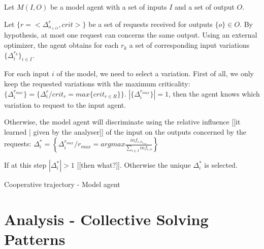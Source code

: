 Let $M(I,O)$ be a model agent with a set of inputs $I$ and a set of output $O$.

Let $\{r= <\Delta_{o_{\in O}}^{r}, crit>\}$ be a set of  requests received for outputs $\{o\} \in O$. By hypothesis, at most one request can concerns the same output.
Using an external optimizer, the agent obtains for each $r_k$ a set of corresponding input variations $\{\Delta_i^{r_k}\}_{i \in I}$.

For each input $i$ of the model, we need to select a variation.
First of all, we only keep the requested variations with the maximum criticality:  $\{\Delta_i^{r_{max}}\} = \{\Delta_i^r / crit_r = max \{crit_{r \in R}\}\}$.
$|\{\Delta_i^{r_{max}}\}| = 1$, then the agent knows which variation to request to the input agent.

Otherwise, the model agent will discriminate using the relative influence [[it learned | given by the analyser]] of the input on the outputs concerned by the requests: 
$\Delta_i^* = \left\{ \Delta_i^{r_{max}} / r_{max} = argmax \frac{inf_{i,o_{r_{max}}}}{\sum \limits_{i \in I} inf_{i,o}} \right\}$

If at this step $|\Delta_i^*| >1$ [[then what?]]. Otherwise the unique $\Delta_i^*$ is selected.

\begin{algorithm}
\DontPrintSemicolon
\caption{Cooperative trajectory - Model agent}
\label{algo_cooperative_trajectory_model}
\begin{algorithmic}
\SetAlgoLined
\end{algorithmic}
\end{algorithm}



\chapter{Analysis - Collective Solving Patterns}